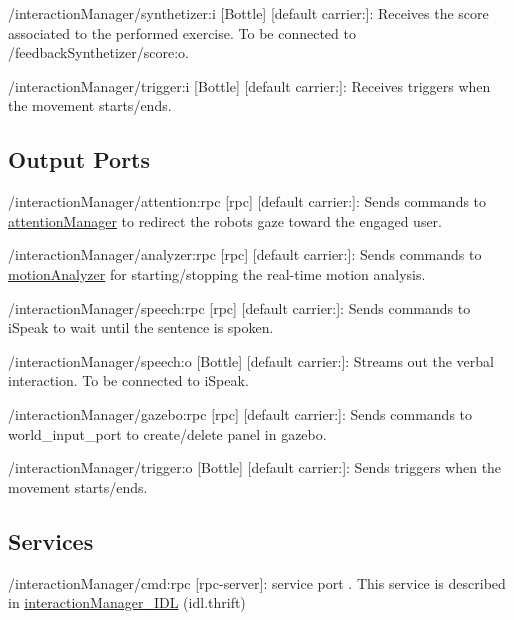 \begin{DoxyItemize}
\item /interaction\+Manager/synthetizer\+:i \mbox{[}Bottle\mbox{]} \mbox{[}default carrier\+:\mbox{]}\+: Receives the score associated to the performed exercise. To be connected to /feedback\+Synthetizer/score\+:o.
\item /interaction\+Manager/trigger\+:i \mbox{[}Bottle\mbox{]} \mbox{[}default carrier\+:\mbox{]}\+: Receives triggers when the movement starts/ends.
\end{DoxyItemize}\hypertarget{group__skeletonViewer_outputports_sec}{}\subsection{Output Ports}\label{group__skeletonViewer_outputports_sec}

\begin{DoxyItemize}
\item /interaction\+Manager/attention\+:rpc \mbox{[}rpc\mbox{]} \mbox{[}default carrier\+:\mbox{]}\+: Sends commands to \hyperlink{group__attentionManager}{attention\+Manager} to redirect the robot\textquotesingle{}s gaze toward the engaged user.
\item /interaction\+Manager/analyzer\+:rpc \mbox{[}rpc\mbox{]} \mbox{[}default carrier\+:\mbox{]}\+: Sends commands to \hyperlink{group__motionAnalyzer}{motion\+Analyzer} for starting/stopping the real-\/time motion analysis.
\item /interaction\+Manager/speech\+:rpc \mbox{[}rpc\mbox{]} \mbox{[}default carrier\+:\mbox{]}\+: Sends commands to i\+Speak to wait until the sentence is spoken.
\item /interaction\+Manager/speech\+:o \mbox{[}Bottle\mbox{]} \mbox{[}default carrier\+:\mbox{]}\+: Streams out the verbal interaction. To be connected to i\+Speak.
\item /interaction\+Manager/gazebo\+:rpc \mbox{[}rpc\mbox{]} \mbox{[}default carrier\+:\mbox{]}\+: Sends commands to world\+\_\+input\+\_\+port to create/delete panel in gazebo.
\item /interaction\+Manager/trigger\+:o \mbox{[}Bottle\mbox{]} \mbox{[}default carrier\+:\mbox{]}\+: Sends triggers when the movement starts/ends.
\end{DoxyItemize}\hypertarget{group__skeletonViewer_services_sec}{}\subsection{Services}\label{group__skeletonViewer_services_sec}

\begin{DoxyItemize}
\item /interaction\+Manager/cmd\+:rpc \mbox{[}rpc-\/server\mbox{]}\+: service port . This service is described in \hyperlink{classinteractionManager__IDL}{interaction\+Manager\+\_\+\+I\+DL} (idl.\+thrift) 
\end{DoxyItemize}